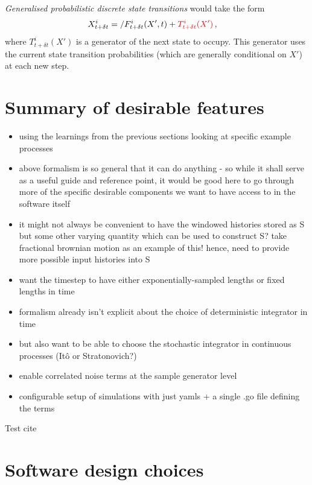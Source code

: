 \documentclass{book}
\begin{document}
\emph{Generalised probabilistic discrete state transitions} would take the form
\begin{align}
& X^i_{t+\delta t} = \slash{F^i_{t+\delta t}(X', t)} + \textcolor{red}{T^i_{t+\delta t}(X')}\,,
\end{align}
where $T^i_{t+\delta t}(X')$ is a generator of the next state to occupy. This generator uses the current state transition probabilities (which are generally conditional on $X'$) at each new step.

\section{\sffamily Summary of desirable features}

\begin{itemize}
\item{using the learnings from the previous sections looking at specific example processes}
\item{above formalism is so general that it can do anything - so while it shall serve as a useful guide and reference point, it would be good here to go through more of the specific desirable components we want to have access to in the software itself}
\item{it might not always be convenient to have the windowed histories stored as S but some other varying quantity which can be used to construct S? take fractional brownian motion as an example of this! hence, need to provide more possible input histories into S}
\item{want the timestep to have either exponentially-sampled lengths or fixed lengths in time}
\item{formalism already isn't explicit about the choice of deterministic integrator in time}
\item{but also want to be able to choose the stochastic integrator in continuous processes (Itô or Stratonovich?)}
\item{enable correlated noise terms at the sample generator level}
\item{configurable setup of simulations with just yamls + a single .go file defining the terms}
\end{itemize}


Test cite~\cite{Dimastrogiovanni:2018xnn}

\section{\sffamily Software design choices}
\end{document}
